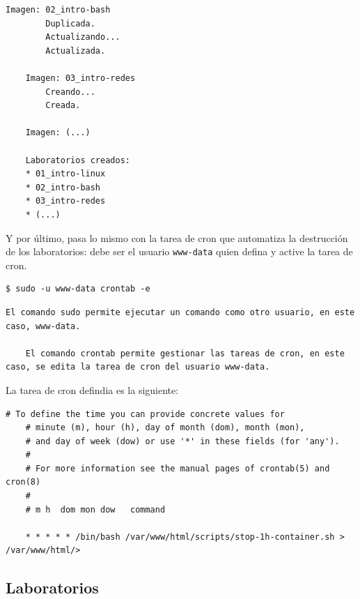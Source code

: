 \begin{appendices}
\begin{lstlisting}[style=bash_style]
    Imagen: 02_intro-bash
        Duplicada.
        Actualizando...
        Actualizada.

    Imagen: 03_intro-redes
        Creando...
        Creada.

    Imagen: (...)

    Laboratorios creados:
    * 01_intro-linux
    * 02_intro-bash
    * 03_intro-redes
    * (...)
        \end{lstlisting}

        Y por último, pasa lo mismo con la tarea de cron que automatiza la destrucción de los laboratorios: debe ser el usuario \texttt{www-data} quien defina y active la tarea de cron.
        \\

        \begin{lstlisting}[style=bash_style]
    $ sudo -u www-data crontab -e
        \end{lstlisting}

        \begin{lstlisting}[style=comment_style]
    El comando sudo permite ejecutar un comando como otro usuario, en este caso, www-data.

    El comando crontab permite gestionar las tareas de cron, en este caso, se edita la tarea de cron del usuario www-data.
        \end{lstlisting}

    La tarea de cron defindia es la siguiente:
    \\

        \begin{lstlisting}[style=bash_style, caption={contenido del fichero},captionpos=b, basicstyle=\ttfamily\scriptsize]
    # To define the time you can provide concrete values for
    # minute (m), hour (h), day of month (dom), month (mon),
    # and day of week (dow) or use '*' in these fields (for 'any').
    # 
    # For more information see the manual pages of crontab(5) and cron(8)
    # 
    # m h  dom mon dow   command

    * * * * * /bin/bash /var/www/html/scripts/stop-1h-container.sh > /var/www/html/>
        \end{lstlisting}

\end{appendices}


\begin{appendices}

    \chapter{Laboratorios}


\end{appendices}


